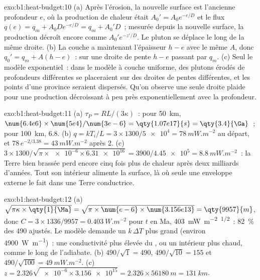 \begin{solution}{exo:b1:heat-budget:10}
(a) Après l'érosion, la nouvelle surface est l'ancienne profondeur $e$, où la
production de chaleur était $A_0' = A_0e^{-e/D}$ et le flux $q(e) = q_m +
A_0De^{-e/D} = q_m + A_0'D$~; mesurée depuis la nouvelle surface, la production
décroît encore comme $A_0'e^{-z'/D}$. Le pluton se déplace le long de la même droite.
(b) La couche a maintenant l'épaisseur $h - e$ avec le même $A$, donc $q_0' = q_m + A(h - e)$~:
sur une droite de pente $h - e$ passant par $q_m$. (c) Seul le modèle exponentiel~: dans le
modèle à couche uniforme, des plutons érodés de profondeurs différentes se
placeraient sur des droites de pentes différentes, et les points d'une province
seraient dispersés. Qu'on observe une seule droite plaide pour une production
décroissant à peu près exponentiellement avec la profondeur.
\end{solution}

\begin{solution}{exo:b1:heat-budget:11}
(a) $\tau_P = RL/(3\kappa)$~: pour \qty{50}{km}, $\num{6.4e6}\times\num{5e4}/\num{3e-6}
= \qty{1.07e17}{s} = \qty{3.4}{\Ga}$~; pour \qty{100}{km}, \qty{6.8}{\Ga}.
(b) $q = kT_i/L = 3\times1300/\num{5e4} = \qty{78}{mW.m^{-2}}$ au départ,
et $78\,e^{-2/3.38} = \qty{43}{mW.m^{-2}}$ après \qty{2}{\Ga}. (c)
$3\times1300/\sqrt{\pi\times\num{e-6}\times\num{6.31e16}} = 3900/\num{4.45e5} =
\qty{8.8}{mW.m^{-2}}$~: la Terre bien brassée perd encore cinq fois plus de chaleur
après deux milliards d'années. Tout son intérieur alimente la surface, là où seule
une enveloppe externe le fait dans une Terre conductrice.
\end{solution}

\begin{solution}{exo:b1:heat-budget:12}
(a) $\sqrt{\pi\kappa\times\qty{1}{\Ma}} = \sqrt{\pi\times\num{e-6}\times\num{3.156e13}}
= \qty{9957}{m}$, donc $C = 3\times1336/9957 = \qty{0.403}{W.m^{-2}}$ pour
$t$ en Ma, \qty{403}{mW.m^{-2}.\Ma^{1/2}}~: \qty{82}{\percent} des 490
ajustés. Le modèle demande un $k\,\Delta T$ plus grand (environ \qty{4900}{W.m^{-1}})~: une
conductivité plus élevée du , ou un intérieur plus chaud, comme le long de l'adiabate.
(b) $490/\sqrt1 = 490$, $490/\sqrt{10} = 155$ et $490/\sqrt{100} =
\qty{49}{mW.m^{-2}}$. (c) $z = 2.326\sqrt{\num{e-6}\times\num{3.156e15}} =
2.326\times\qty{56180}{m} = \qty{131}{km}$.
\end{solution}

